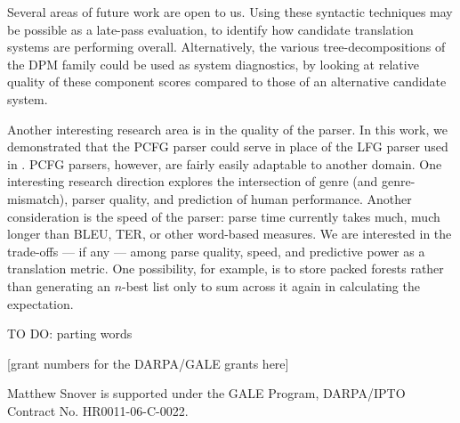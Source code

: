 \documentclass{kluwer}    %
\begin{document}
\begin{article}
Several areas of future work are open to us. Using these syntactic
techniques may be possible as a late-pass evaluation, to identify how
candidate translation systems are performing overall.  Alternatively,
the various tree-decompositions of the DPM family could be used as
system diagnostics, by looking at relative quality of these component
scores compared to those of an alternative candidate system.

Another interesting research area is in the quality of the parser.  In
this work, we demonstrated that the
 PCFG parser could serve in
place of the LFG parser used in
. PCFG parsers, however, are
fairly easily adaptable to another domain. One interesting research
direction explores the intersection of genre (and genre-mismatch),
parser quality, and prediction of human performance. Another
consideration is the speed of the parser: parse time currently takes
much, much longer than BLEU, TER, or other word-based measures. We are
interested in the trade-offs --- if any --- among parse quality,
speed, and predictive power as a translation metric.  One possibility,
for example, is to store packed forests \cite{huang08packedforests}
rather than generating an $n$-best list only to sum across it again in
calculating the expectation.

TO DO: parting words




\acknowledgements

[grant numbers for the DARPA/GALE grants here]

Matthew Snover is supported under the GALE Program, DARPA/IPTO
Contract No. HR0011-06-C-0022.






\end{article}
\end{document}
